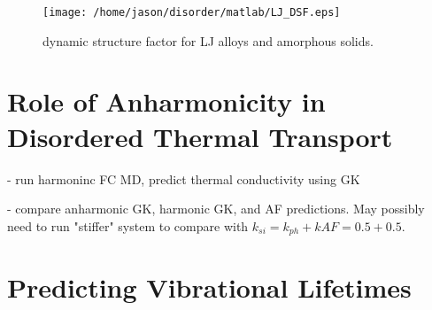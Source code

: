 \documentclass[aps,prb,preprint,superscriptaddress,amsmath,amssymb,floatfix]{revtex4}
\begin{document}
\begin{figure}
\begin{center}
\texttt{[image: /home/jason/disorder/matlab/LJ\_DSF.eps]}
\vspace*{-5mm}
\end{center}
\caption{\label{FIG:phonon_diff} dynamic structure factor for LJ alloys 
and amorphous solids.}
\end{figure}

\vspace*{100mm}

\section{\label{S-Motivation-Amorphous}Role of Anharmonicity in 
Disordered Thermal Transport}
- run harmoninc FC MD, predict thermal conductivity using GK

- compare anharmonic GK, harmonic GK, and AF predictions. May possibly 
need to run "stiffer" system to compare with 
$k_{si} = k_{ph} + k{AF} = 0.5+0.5$. 


\vspace*{100mm}


\appendix
\section{\label{A-Predicting-Phonons}Predicting Vibrational Lifetimes}
\end{document}
